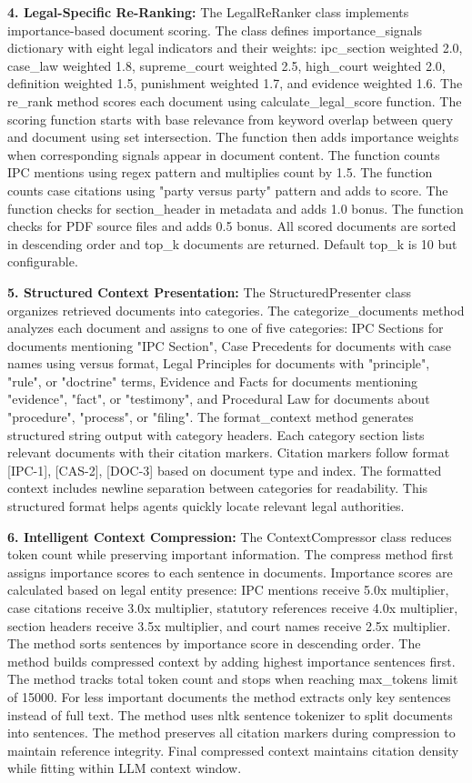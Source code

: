 \documentclass[12pt,singleside,a4paper]{article}
\begin{document}
\textbf{4. Legal-Specific Re-Ranking:}
The LegalReRanker class implements importance-based document scoring. The class defines importance\_signals dictionary with eight legal indicators and their weights: ipc\_section weighted 2.0, case\_law weighted 1.8, supreme\_court weighted 2.5, high\_court weighted 2.0, definition weighted 1.5, punishment weighted 1.7, and evidence weighted 1.6. The re\_rank method scores each document using calculate\_legal\_score function. The scoring function starts with base relevance from keyword overlap between query and document using set intersection. The function then adds importance weights when corresponding signals appear in document content. The function counts IPC mentions using regex pattern and multiplies count by 1.5. The function counts case citations using "party versus party" pattern and adds to score. The function checks for section\_header in metadata and adds 1.0 bonus. The function checks for PDF source files and adds 0.5 bonus. All scored documents are sorted in descending order and top\_k documents are returned. Default top\_k is 10 but configurable.

\textbf{5. Structured Context Presentation:}
The StructuredPresenter class organizes retrieved documents into categories. The categorize\_documents method analyzes each document and assigns to one of five categories: IPC Sections for documents mentioning "IPC Section", Case Precedents for documents with case names using versus format, Legal Principles for documents with "principle", "rule", or "doctrine" terms, Evidence and Facts for documents mentioning "evidence", "fact", or "testimony", and Procedural Law for documents about "procedure", "process", or "filing". The format\_context method generates structured string output with category headers. Each category section lists relevant documents with their citation markers. Citation markers follow format [IPC-1], [CAS-2], [DOC-3] based on document type and index. The formatted context includes newline separation between categories for readability. This structured format helps agents quickly locate relevant legal authorities.

\textbf{6. Intelligent Context Compression:}
The ContextCompressor class reduces token count while preserving important information. The compress method first assigns importance scores to each sentence in documents. Importance scores are calculated based on legal entity presence: IPC mentions receive 5.0x multiplier, case citations receive 3.0x multiplier, statutory references receive 4.0x multiplier, section headers receive 3.5x multiplier, and court names receive 2.5x multiplier. The method sorts sentences by importance score in descending order. The method builds compressed context by adding highest importance sentences first. The method tracks total token count and stops when reaching max\_tokens limit of 15000. For less important documents the method extracts only key sentences instead of full text. The method uses nltk sentence tokenizer to split documents into sentences. The method preserves all citation markers during compression to maintain reference integrity. Final compressed context maintains citation density while fitting within LLM context window.
\end{document}
